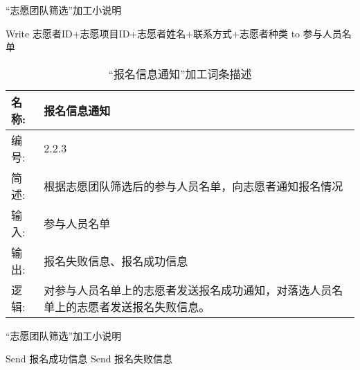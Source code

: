 \begin{algorithm}[H]
    \renewcommand{\thealgorithm}{}
    \caption{``志愿团队筛选”加工小说明} 
    \label{alg3} 
    \begin{algorithmic}[1]
        \STATE Write 志愿者ID+志愿项目ID+志愿者姓名+联系方式+志愿者种类 to 参与人员名单
        \ENDIF
    \end{algorithmic} 
\end{algorithm}


\begin{table}[H]  
\caption{``报名信息通知”加工词条描述}  
\begin{center}  
    \begin{tabular}{l p{11cm}} 
        \hline
        \quad 名称: & 报名信息通知\\
        \hline
        \quad 编号: & 2.2.3 \\
        \hline
        \quad 简述: & 根据志愿团队筛选后的参与人员名单，向志愿者通知报名情况 \\
        \hline
        \quad 输入:& 参与人员名单 \\
        \hline
        \quad 输出:& 报名失败信息、报名成功信息\\
        \hline
        \quad 逻辑:& 对参与人员名单上的志愿者发送报名成功通知，对落选人员名单上的志愿者发送报名失败信息。 \\
        \hline
    \end{tabular}
    \label{tab1}
\end{center}
\end{table}


\begin{algorithm}[H]
    \renewcommand{\thealgorithm}{}
    \caption{``志愿团队筛选”加工小说明} 
    \label{alg3} 
    \begin{algorithmic}[1]
        \STATE Send 报名成功信息
        \ENDFOR
        \STATE Send 报名失败信息
        \ENDFOR
    \end{algorithmic} 
\end{algorithm}
